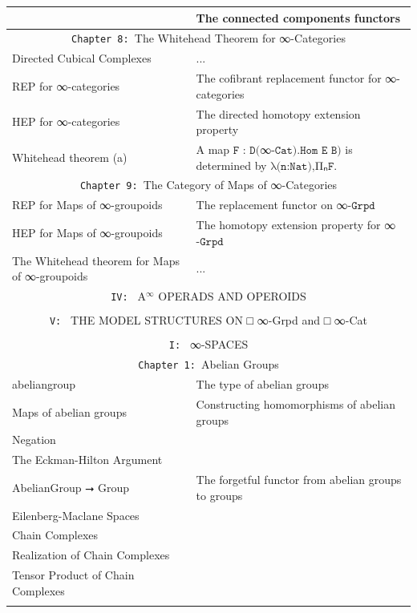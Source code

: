 \documentclass{book}
\theoremstyle{definition}
\begin{document}
{\begin{longtable}{|| l || l ||}
{ \hline 
Π⃗ₙ : ∞-Cat ⭢ Set & The connected components functors\\
 \hline \hline
 \multicolumn{2}{||c||}{\texttt{Chapter 8: }The Whitehead Theorem for ∞-Categories} \\
\hline \hline
Directed Cubical Complexes & ...\\
\hline
REP for ∞-categories & The cofibrant replacement functor for ∞-categories\\
\hline
HEP for ∞-categories & The directed homotopy extension property\\
\hline 
Whitehead theorem (a) & A map $\texttt{F : D(}$∞$\texttt{-Cat).Hom E B)}$ is determined by $\texttt{λ(n:Nat),}$Π⃗ₙ$\texttt{F}$.\\
\hline \hline
\multicolumn{2}{||c||}{\texttt{Chapter 9: }The Category of Maps of ∞-Categories} \\
\hline \hline
REP for Maps of ∞-groupoids & The replacement functor on ∞$\texttt{-Grpd}$ \\
\hline
HEP for Maps of ∞-groupoids & The homotopy extension property for ∞$\texttt{-Grpd}$\\
 \hline 
The Whitehead theorem for Maps of ∞-groupoids & ... \\
\hline \hline
 \multicolumn{2}{||c||}{\texttt{IV: } A${}^{\infty}$ OPERADS AND OPEROIDS} \\
\hline \hline
 &  \\
\hline \hline
 \multicolumn{2}{||c||}{\texttt{V: } THE MODEL STRUCTURES ON □ ∞-Grpd and □ ∞-Cat} \\
\hline \hline
 & \\
\hline \hline
\multicolumn{2}{||c||}{\texttt{I: } ∞-SPACES} \\
\hline \hline
 \multicolumn{2}{||c||}{\texttt{Chapter 1: }Abelian Groups} \\
\hline \hline
abeliangroup & The type of abelian groups \\
\hline
Maps of abelian groups & Constructing homomorphisms of abelian groups \\
\hline
Negation & \\
\hline
The Eckman-Hilton Argument & \\
\hline
AbelianGroup ⭢ Group & The forgetful functor from abelian groups to groups \\
\hline
Eilenberg-Maclane Spaces & \\
\hline
Chain Complexes & \\
\hline
Realization of Chain Complexes & \\
\hline
Tensor Product of Chain Complexes & \\
}
\end{longtable}}
\end{document}
